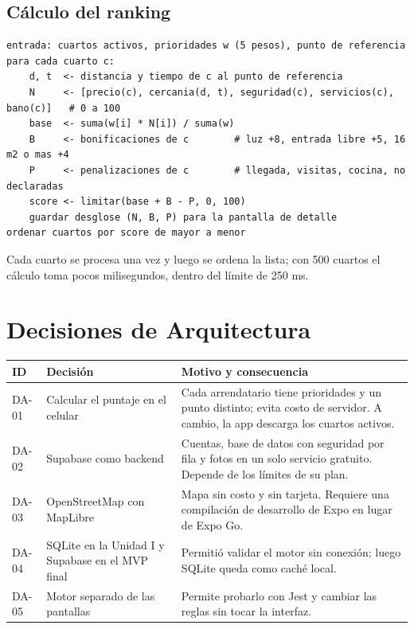 \documentclass[11pt,a4paper]{article}
\begin{document}
\subsection{Cálculo del ranking}
\begin{lstlisting}
entrada: cuartos activos, prioridades w (5 pesos), punto de referencia
para cada cuarto c:
    d, t  <- distancia y tiempo de c al punto de referencia
    N     <- [precio(c), cercania(d, t), seguridad(c), servicios(c), bano(c)]   # 0 a 100
    base  <- suma(w[i] * N[i]) / suma(w)
    B     <- bonificaciones de c        # luz +8, entrada libre +5, 16 m2 o mas +4
    P     <- penalizaciones de c        # llegada, visitas, cocina, no declaradas
    score <- limitar(base + B - P, 0, 100)
    guardar desglose (N, B, P) para la pantalla de detalle
ordenar cuartos por score de mayor a menor
\end{lstlisting}
\noindent Cada cuarto se procesa una vez y luego se ordena la lista; con 500 cuartos el cálculo toma pocos milisegundos, dentro del límite de 250 ms.

\section{Decisiones de Arquitectura}
{\small
{}
\noindent\begin{tabularx}{\textwidth}{@{}C{1.3cm} P{3.6cm} L@{}}
\toprule
{}
\textbf{ID} & \textbf{Decisión} & \textbf{Motivo y consecuencia} \\
\midrule
DA-01 & Calcular el puntaje en el celular & Cada arrendatario tiene prioridades y un punto distinto; evita costo de servidor. A cambio, la app descarga los cuartos activos. \\
DA-02 & Supabase como backend & Cuentas, base de datos con seguridad por fila y fotos en un solo servicio gratuito. Depende de los límites de su plan. \\
DA-03 & OpenStreetMap con MapLibre & Mapa sin costo y sin tarjeta. Requiere una compilación de desarrollo de Expo en lugar de Expo Go. \\
DA-04 & SQLite en la Unidad I y Supabase en el MVP final & Permitió validar el motor sin conexión; luego SQLite queda como caché local. \\
DA-05 & Motor separado de las pantallas & Permite probarlo con Jest y cambiar las reglas sin tocar la interfaz. \\
\bottomrule
\end{tabularx}
}
\end{document}
